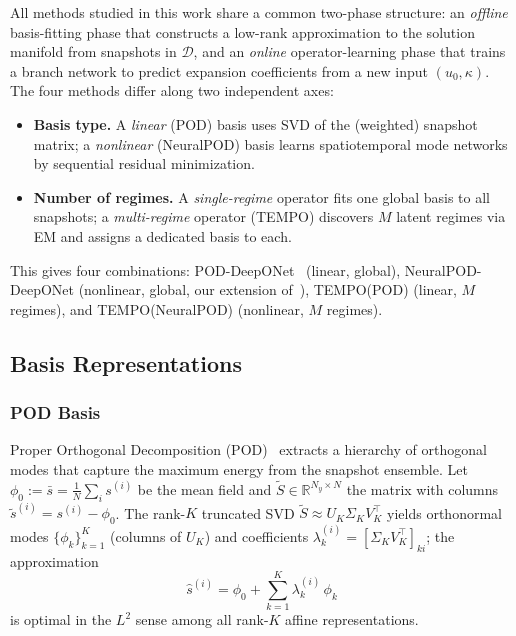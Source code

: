 \documentclass[preprint,10pt]{elsarticle}
\begin{document}
All methods studied in this work share a common two-phase structure:
an \emph{offline} basis-fitting phase that constructs a low-rank
approximation to the solution manifold from snapshots in $\mathcal{D}$,
and an \emph{online} operator-learning phase that trains a branch
network to predict expansion coefficients from a new input
$(u_0, \kappa)$.
The four methods differ along two independent axes:

\begin{itemize}
  \item \textbf{Basis type.}
    A \emph{linear} (POD) basis uses SVD of the (weighted) snapshot
    matrix; a \emph{nonlinear} (NeuralPOD) basis learns spatiotemporal
    mode networks by sequential residual minimization.
  \item \textbf{Number of regimes.}
    A \emph{single-regime} operator fits one global basis to all
    snapshots; a \emph{multi-regime} operator (TEMPO) discovers $M$
    latent regimes via EM and assigns a dedicated basis to each.
\end{itemize}

\noindent
This gives four combinations:
POD-DeepONet~\cite{Lu2022} (linear, global),
NeuralPOD-DeepONet (nonlinear, global, our extension of~\cite{Mou2026}),
TEMPO(POD) (linear, $M$ regimes), and
TEMPO(NeuralPOD) (nonlinear, $M$ regimes).

\subsection{Basis Representations}\label{sec:bases}


\subsubsection{POD Basis}

Proper Orthogonal Decomposition (POD)~\cite{Berkooz1993} extracts a hierarchy of orthogonal modes that capture the maximum energy from the snapshot ensemble.
Let $\phi_0 := \bar{s} = \tfrac{1}{N}\sum_i s^{(i)}$ be the mean field
and $\tilde{S} \in \mathbb{R}^{N_y \times N}$ the matrix with columns
$\tilde{s}^{(i)} = s^{(i)} - \phi_0$.
The rank-$K$ truncated SVD $\tilde{S} \approx U_K \Sigma_K V_K^\top$
yields orthonormal modes $\{\phi_k\}_{k=1}^K$ (columns of $U_K$) and
coefficients $\lambda_k^{(i)} = [\Sigma_K V_K^\top]_{ki}$; the
approximation
\begin{equation}
  \hat{s}^{(i)} = \phi_0 + \sum_{k=1}^{K} \lambda_k^{(i)}\,\phi_k
  \label{eq:pod_approx}
\end{equation}
is optimal in the $L^2$ sense among all rank-$K$ affine representations.
\end{document}
